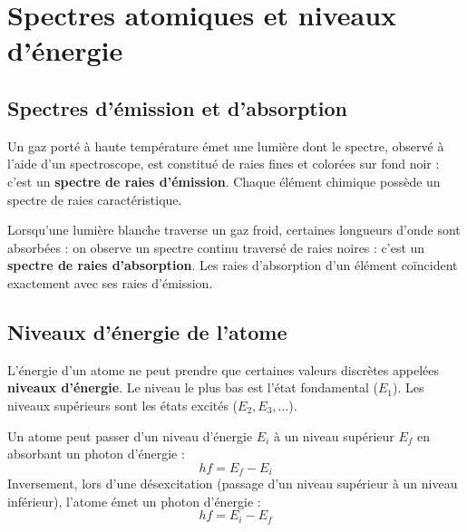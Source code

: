 \section{Spectres atomiques et niveaux d'énergie}

\subsection{Spectres d'émission et d'absorption}

\begin{definition}
Un gaz porté à haute température émet une lumière dont le spectre, observé à l'aide d'un spectroscope, est constitué de raies fines et colorées sur fond noir : c'est un \textbf{spectre de raies d'émission}. Chaque élément chimique possède un spectre de raies caractéristique.
\end{definition}

\begin{definition}
Lorsqu'une lumière blanche traverse un gaz froid, certaines longueurs d'onde sont absorbées : on observe un spectre continu traversé de raies noires : c'est un \textbf{spectre de raies d'absorption}. Les raies d'absorption d'un élément coïncident exactement avec ses raies d'émission.
\end{definition}

\subsection{Niveaux d'énergie de l'atome}

\begin{loi}
L'énergie d'un atome ne peut prendre que certaines valeurs discrètes appelées \textbf{niveaux d'énergie}. Le niveau le plus bas est l'état fondamental (\(E_1\)). Les niveaux supérieurs sont les états excités (\(E_2, E_3, \dots\)).
\end{loi}

\begin{loi}
Un atome peut passer d'un niveau d'énergie \(E_i\) à un niveau supérieur \(E_f\) en absorbant un photon d'énergie :
\[
h f = E_f - E_i
\]
Inversement, lors d'une désexcitation (passage d'un niveau supérieur à un niveau inférieur), l'atome émet un photon d'énergie :
\[
h f = E_i - E_f
\]
\end{loi}

